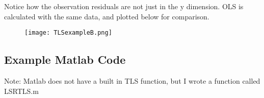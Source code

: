 Notice how the observation residuals are not just in the y dimension.  OLS is calculated with the same data, and plotted below for comparison.

\begin{figure}[H]
	\centering
	\texttt{[image: TLSexampleB.png]}
\end{figure}
\clearpage
\subsection{Example Matlab Code}


Note: Matlab does not have a built in TLS function, but I wrote a function called LSRTLS.m

